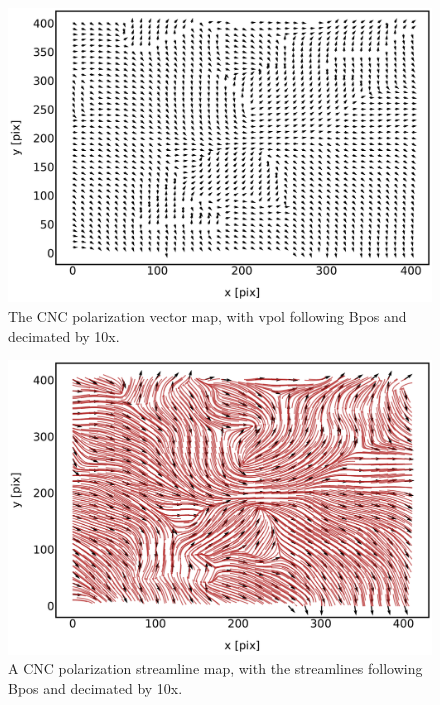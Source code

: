 \begin{figure}[!htbp]
\centering
\includegraphics[width=\textwidth]{figures/carina/vectors_10}
\caption[~The CNC polarization vector map, decimated by 10x.]{The CNC polarization vector map, with \gls{vpol} following \gls{Bpos} and decimated by 10x.}
\label{fig:vectors_10}
\end{figure}

\begin{figure}[!htbp]
\centering
\includegraphics[width=\textwidth]{figures/carina/vector_sl_21_ds10}
\caption[~The CNC polarization-streamline map, with streamlines decimated by 10x.]{A CNC polarization streamline map, with the streamlines following \gls{Bpos} and decimated by 10x.}
\label{fig:vector_sl_21_ds10}
\end{figure}

